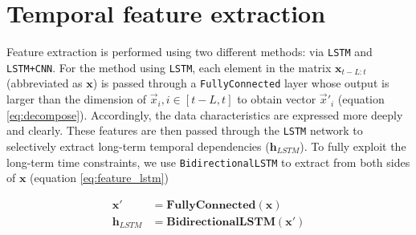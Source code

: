 \section{Temporal feature extraction}


Feature extraction is performed using two different methods: via \verb|LSTM| and \verb|LSTM+CNN|. For the method using \verb|LSTM|, each element in the matrix $\mathbf{x}_{t-L:t}$ (abbreviated as $\mathbf{x}$) is passed through a \verb|FullyConnected| layer whose output is larger than the dimension of $\vec x_i, i\in[t-L, t]$ to obtain vector $\vec x'_i$ (equation \ref{eq:decompose}). Accordingly, the data characteristics are expressed more deeply and clearly. These features are then passed through the \verb|LSTM| network to selectively extract long-term temporal dependencies ($\mathbf{h}_{LSTM}$). To fully exploit the long-term time constraints, we use \verb|BidirectionalLSTM| to extract from both sides of $\mathbf{x}$ (equation \ref{eq:feature_lstm})

\begin{align}
    \mathbf{x'} &= \mathbf{FullyConnected}\left( \mathbf{x} \right) \label{eq:decompose}\\
    \mathbf{h}_{LSTM} &= \mathbf{BidirectionalLSTM}\left( \mathbf{x'} \right) \label{eq:feature_lstm}
\end{align}


